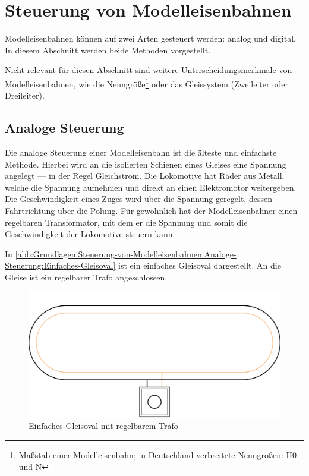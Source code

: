 \section{Steuerung von Modelleisenbahnen}\label{text:Grundlagen:Steuerung-von-Modelleisenbahnen}

Modelleisenbahnen können auf zwei Arten gesteuert werden: analog und digital. In diesem Abschnitt werden beide Methoden vorgestellt.

Nicht relevant für diesen Abschnitt sind weitere Unterscheidungsmerkmale von Modelleisenbahnen, wie die Nenngröße\footnote{Maßstab einer Modelleisenbahn; in Deutschland verbreitete Nenngrößen: H0 und N} oder das Gleissystem (Zweileiter oder Dreileiter).

\subsection{Analoge Steuerung}\label{text:Grundlagen:Steuerung-von-Modelleisenbahnen:Analoge-Steuerung}

Die analoge Steuerung einer Modelleisenbahn ist die älteste und einfachste Methode. Hierbei wird an die isolierten Schienen eines Gleises eine Spannung angelegt --- in der Regel Gleichstrom. Die Lokomotive hat Räder aus Metall, welche die Spannung aufnehmen und direkt an einen Elektromotor weitergeben. Die Geschwindigkeit eines Zuges wird über die Spannung geregelt, dessen Fahrtrichtung über die Polung. Für gewöhnlich hat der Modelleisenbahner einen regelbaren Transformator, mit dem er die Spannung und somit die Geschwindigkeit der Lokomotive steuern kann.~\cite[][S. 178 ff.]{bib:Modellbauhandbuch}

In \autoref{abb:Grundlagen:Steuerung-von-Modelleisenbahnen:Analoge-Steuerung:Einfaches-Gleisoval} ist ein einfaches Gleisoval dargestellt. An die Gleise ist ein regelbarer Trafo angeschlossen.

\begin{figure}[H]
    \centering
    \includegraphics[width=\textwidth]{Assets/Images/2-Grundlagen/Modelleisenbahnen-Einfaches-Gleisoval.png}
    \caption{Einfaches Gleisoval mit regelbarem Trafo~\cite[nach][S. 180]{bib:Modellbauhandbuch}}\label{abb:Grundlagen:Steuerung-von-Modelleisenbahnen:Analoge-Steuerung:Einfaches-Gleisoval}
\end{figure}

